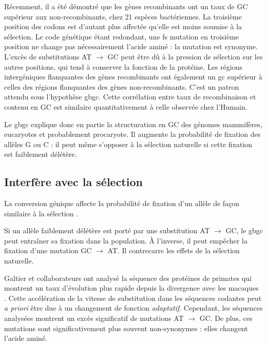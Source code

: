 \documentclass[11pt, oneside]{scrartcl}
\begin{document}
Récemment, il a été démontré que les gènes recombinants ont un taux de GC
supérieur aux non-recombinants\cite{lassalle_gc-content_2015}, chez 21 espèces
bactériennes. La troisième position des codons est d'autant plus affectée
qu'elle est moins soumise à la sélection. Le code génétique étant redondant, une fs
mutation en troisième position ne change pas nécessairement l'acide aminé : la
mutation est synonyme. L'excès de substitutions AT \(\rightarrow\) GC peut être dû
à la pression de sélection sur les autres positions, qui tend à conserver la
fonction de la protéine. Les régions intergéniques flanquantes des gènes
recombinants ont également un \ac{gc} supérieur à celles des régions flanquantes
des gènes non-recombinants. C'est un patron attendu sous l'hypothèse \ac{gbgc}.
Cette corrélation entre taux de recombinaison et contenu en GC est similaire
quantitativement à celle observée chez l'Humain\cite{lassalle_gc-content_2015}.

\begin{transition}
  Le \ac{gbgc} explique donc en partie la structuration en GC des génomes
  mammifères, eucaryotes et probablement procaryote. Il augmente la probabilité
  de fixation des allèles G ou C : il peut même s'opposer à la sélection
  naturelle si cette fixation est faiblement délétère.  
\end{transition}


\subsection{Interfère avec la sélection}
\label{sec:orgheadline15}
La conversion génique affecte la probabilité de fixation d'un allèle de façon
similaire à la sélection \cite{nagylaki_evolution_1983}.

Si un allèle faiblement délétère est porté par une substitution AT \(\rightarrow\)
GC, le \ac{gbgc} peut entraîner sa fixation dans la population. À l'inverse, il
peut empêcher la fixation d'une mutation GC \(\rightarrow\) AT. Il contrecarre les
effets de la sélection naturelle.

Galtier et collaborateurs ont analysé la séquence des protéines de primates qui
montrent un taux d'évolution plus rapide depuis la divergence avec les macaques
\cite{galtier_gc-biased_2009}. Cette accélération de la vitesse de substitution
dans les séquences codantes peut \emph{a priori} être due à un changement de fonction
\emph{adaptatif}. Cependant, les séquences analysées montrent un excès significatif
de mutations AT \(\rightarrow\) GC. De plus, ces mutations sont significativement
plus souvent non-synonymes : elles changent l'acide aminé.
\end{document}
